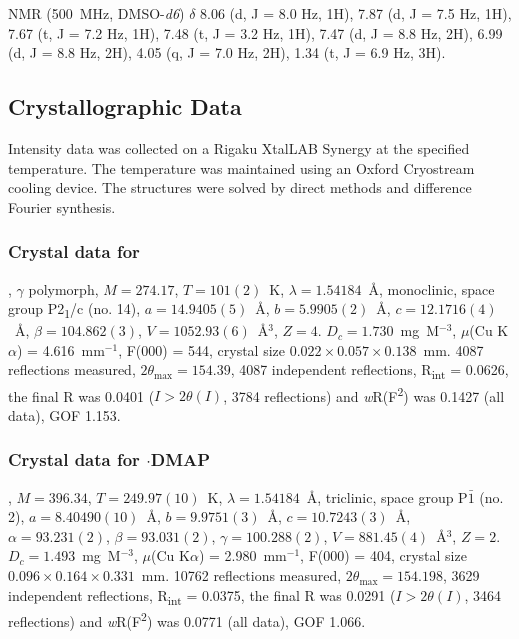 \begin{refsection}
 NMR (500~MHz, DMSO-\emph{d6}) $\delta$ 8.06 (d, J = 8.0 Hz, 1H), 7.87 (d, J = 7.5 Hz, 1H), 7.67 (t, J = 7.2 Hz, 1H), 7.48 (t, J = 3.2 Hz, 1H), 7.47 (d, J = 8.8 Hz, 2H), 6.99 (d, J = 8.8 Hz, 2H), 4.05 (q, J = 7.0 Hz, 2H), 1.34 (t, J = 6.9 Hz, 3H).

\subsection{Crystallographic Data}
Intensity data was collected on a Rigaku XtalLAB Synergy at the specified temperature. The temperature was maintained using an Oxford Cryostream cooling device. The structures were solved by direct methods and difference Fourier synthesis.\autocite{Sheldrick2015}

\subsubsection{Crystal data for \texorpdfstring{}{C13 H9 N O Se}}
, $\gamma$ polymorph, $M=274.17$, $T=101(2)$~K, $\lambda=1.54184$~\AA, monoclinic, space group P2\textsubscript{1}/c (no. 14), $a = 14.9405(5)$~\AA, $b = 5.9905(2)$~\AA, $c = 12.1716(4)$~\AA, $\beta = 104.862(3)$\degree, $V = 1052.93(6)$~\AA$^{3}$, $Z = 4$. $D_{c}= 1.730$~mg~M$^{-3}$, $\mu$(Cu K$\alpha$) = 4.616~mm$^{-1}$, F(000) = 544, crystal size $0.022 \times 0.057 \times 0.138$~mm. 4087 reflections measured, $2\theta_{\mathrm{max}}=154.39$\degree, 4087 independent reflections, R\textsubscript{int} = 0.0626, the final R was 0.0401 ($I > 2\theta(I)$, 3784 reflections) and \emph{w}R(F\textsuperscript{2}) was 0.1427 (all data), GOF 1.153.

\subsubsection{Crystal data for \texorpdfstring{$\cdot$DMAP}{C20 H19 N3 O Se}}
, $M=396.34$, $T=249.97(10)$~K, $\lambda=1.54184$~\AA, triclinic, space group P$\bar{1}$ (no. 2), $a = 8.40490(10)$~\AA, $b = 9.9751(3)$~\AA, $c = 10.7243(3)$~\AA, $\alpha = 93.231(2)$\degree, $\beta = 93.031(2)$\degree, $\gamma = 100.288(2)$\degree, $V = 881.45(4)$~\AA$^{3}$, $Z = 2$. $D_{c}= 1.493$~mg~M$^{-3}$, $\mu$(Cu K$\alpha$) = 2.980~mm$^{-1}$, F(000) = 404, crystal size $0.096 \times 0.164 \times 0.331$~mm. 10762 reflections measured, $2\theta_{\mathrm{max}}=154.198$\degree, 3629 independent reflections, R\textsubscript{int} = 0.0375, the final R was 0.0291 ($I > 2\theta(I)$, 3464 reflections) and \emph{w}R(F\textsuperscript{2}) was 0.0771 (all data), GOF 1.066.


\end{refsection}
